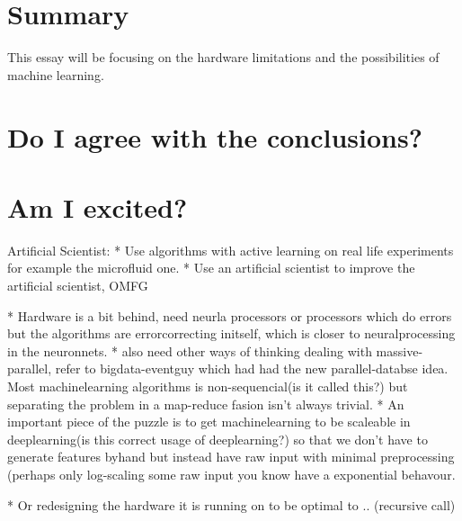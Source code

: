 \documentclass{article}
\begin{document}

\section{Summary} %
    This essay will be focusing on the hardware limitations
    and the possibilities of machine learning.


%
%   
%       
%
%   



\section{Do I agree with the conclusions?}

    
        

\section{Am I excited?}

    Artificial Scientist: 
    * Use algorithms with active learning on real life experiments for example the
    microfluid one.
    * Use an artificial scientist to improve the artificial scientist, OMFG

    * Hardware is a bit  behind, need neurla processors or processors which do
    errors but the algorithms are errorcorrecting initself, which is closer to
    neuralprocessing in the neuronnets.
    * also need other ways of thinking dealing with massive-parallel, refer to
    bigdata-eventguy which had had the new parallel-databse idea. Most
    machinelearning algorithms is non-sequencial(is it called this?) but separating
    the problem in a map-reduce fasion isn't always trivial.
    * An important piece of the puzzle is to get machinelearning to be scaleable in
    deeplearning(is this correct usage of deeplearning?) so that we don't have to
    generate features byhand but instead have raw input with minimal preprocessing
    (perhaps only log-scaling some raw input you know have a exponential behavour.

    * Or redesigning the hardware it is running on to be optimal to .. (recursive
    call)
\end{document}
